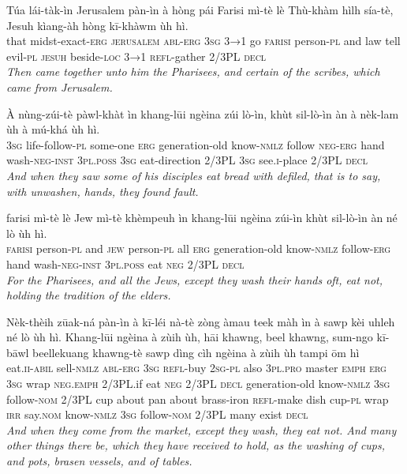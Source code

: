 \documentclass[11pt,a4paper]{article}
\begin{document}
\begin{exe}
\gll Túa lái-tàk-ìn Jerusalem pàn-ìn à hòng pái Farisi mì-tè lè Thù-khàm hìlh sía-tè, Jesuh kìang-àh hòng kī-khàwm ùh hì. \\
     that midst-exact-\textsc{erg} \textsc{jerusalem} \textsc{abl}-\textsc{erg} \textsc{3sg} \textsc{3→1} go \textsc{farisi} person-\textsc{pl} and law tell evil-\textsc{pl} \textsc{jesuh} beside-\textsc{loc} \textsc{3→1} \textsc{refl}-gather 2/3PL \textsc{decl} \\
\glt \textcolor{kjvcolor}{\textit{Then came together unto him the Pharisees, and certain of the scribes, which came from Jerusalem.}}

\gll À nùng-zúi-tè pàwl-khàt ìn khang-lūi ngèina zúi lò-ìn, khùt sil-lò-ìn àn à nèk-lam ùh à mú-khá ùh hì. \\
     \textsc{3sg} life-follow-\textsc{pl} some-one \textsc{erg} generation-old know-\textsc{nmlz} follow \textsc{neg}-\textsc{erg} hand wash-\textsc{neg}-\textsc{inst} \textsc{3pl}.\textsc{poss} \textsc{3sg} eat-direction 2/3PL \textsc{3sg} see.\textsc{i}-place 2/3PL \textsc{decl} \\
\glt \textcolor{kjvcolor}{\textit{And when they saw some of his disciples eat bread with defiled, that is to say, with unwashen, hands, they found fault.}}

\gll farisi mì-tè lè Jew mì-tè khèmpeuh ìn khang-lūi ngèina zúi-ìn khùt sil-lò-ìn àn né lò ùh hì. \\
     \textsc{farisi} person-\textsc{pl} and \textsc{jew} person-\textsc{pl} all \textsc{erg} generation-old know-\textsc{nmlz} follow-\textsc{erg} hand wash-\textsc{neg}-\textsc{inst} \textsc{3pl}.\textsc{poss} eat \textsc{neg} 2/3PL \textsc{decl} \\
\glt \textcolor{kjvcolor}{\textit{For the Pharisees, and all the Jews, except they wash their hands oft, eat not, holding the tradition of the elders.}}

\gll Nèk-thèih zūak-ná pàn-ìn à kī-léi nà-tè zòng àmau teek màh ìn à sawp kèi uhleh né lò ùh hì. Khang-lūi ngèina à zùih ùh, hāi khawng, beel khawng, sum-ngo kī-bāwl beellekuang khawng-tè sawp dìng cìh ngèina à zùih ùh tampi ōm hì \\
     eat.\textsc{ii}-\textsc{abil} sell-\textsc{nmlz} \textsc{abl}-\textsc{erg} \textsc{3sg} \textsc{refl}-buy \textsc{2sg}-\textsc{pl} also \textsc{3pl}.\textsc{pro} master \textsc{emph} \textsc{erg} \textsc{3sg} wrap \textsc{neg}.\textsc{emph} 2/3PL.if eat \textsc{neg} 2/3PL \textsc{decl} generation-old know-\textsc{nmlz} \textsc{3sg} follow-\textsc{nom} 2/3PL cup about pan about brass-iron \textsc{refl}-make dish cup-\textsc{pl} wrap \textsc{irr} say.\textsc{nom} know-\textsc{nmlz} \textsc{3sg} follow-\textsc{nom} 2/3PL many exist \textsc{decl} \\
\glt \textcolor{kjvcolor}{\textit{And when they come from the market, except they wash, they eat not. And many other things there be, which they have received to hold, as the washing of cups, and pots, brasen vessels, and of tables.}}


\end{exe}
\end{document}
